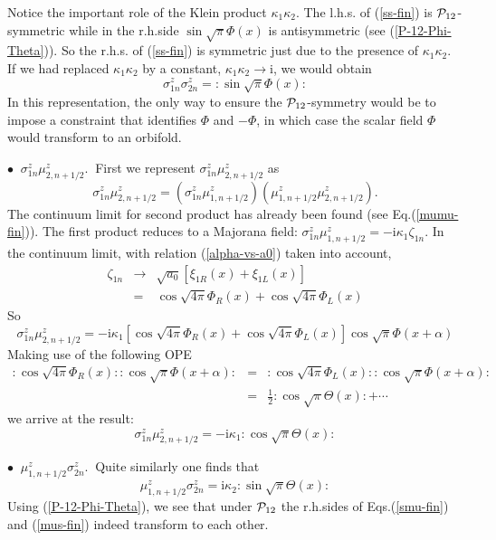 Notice the important role of the Klein product $\kappa_1 \kappa_2$.
The l.h.s. of (\ref{ss-fin}) is ${\cal{P}}_{12}$-symmetric while
in the r.h.side $\sin \sqrt{\pi} \Phi (x)$ is antisymmetric
(see (\ref{P-12-Phi-Theta})).
So the r.h.s. of (\ref{ss-fin}) is symmetric just due to
the presence of $\kappa_1 \kappa_2$. If we had replaced $\kappa_1 \kappa_2$
by a constant, $\kappa_1 \kappa_2 \rightarrow \mbox{i}$,
we would obtain
$$
\sigma^z _{1n} \sigma^z _{2n} = :\sin \sqrt{\pi} \Phi (x):
$$
In this representation, the only way
to ensure the ${\cal{P}}_{12}$-symmetry would be to
impose a constraint that identifies $\Phi$ and $- \Phi$, in which case
the scalar field $\Phi$ would transform to an orbifold.

\medskip
$\bullet~$ \underline{$\sigma^z _{1n} \mu^z _{2,n+1/2}$}.$~$
First we represent $\sigma^z _{1n} \mu^z _{2,n+1/2}$ as
$$
\sigma^z _{1n} \mu^z _{2,n+1/2} =
\left( \sigma^z _{1n} \mu^z _{1,n+1/2} \right)
\left( \mu^z _{1,n+1/2} \mu^z _{2,n+1/2}\right).
$$
The continuum limit for second product has already
been found (see Eq.(\ref{mumu-fin})).
The first product reduces to a Majorana field:
$
\sigma^z _{1n} \mu^z _{1,n+1/2} = - \mbox{i} \kappa_1 \zeta_{1n}.
$
In the continuum limit, with relation (\ref{alpha-vs-a0}) taken into account,
\begin{eqnarray}
\zeta_{1n} &\rightarrow& \sqrt{a_0} \left[ \xi_{1R} (x) + \xi_{1L} (x) \right]\nonumber\\
&=& \cos \sqrt{4\pi} \Phi_R (x) + \cos \sqrt{4\pi} \Phi_L (x)
\label{zeta_1-cont}
\end{eqnarray}
So
\begin{equation}
\sigma^z _{1n} \mu^z _{2,n+1/2} = - \mbox{i} \kappa_1
\left[ \cos \sqrt{4\pi} \Phi_R (x) + \cos \sqrt{4\pi} \Phi_L (x) \right]
\cos \sqrt{\pi} \Phi (x + \alpha)
\label{smu-int1}
\end{equation}
Making use of the following OPE
\begin{eqnarray}
:\cos \sqrt{4\pi} \Phi_R (x)::\cos \sqrt{\pi} \Phi (x + \alpha):
&=& :\cos \sqrt{4\pi} \Phi_L (x)::\cos \sqrt{\pi} \Phi (x + \alpha):\nonumber\\
&=& \frac{1}{2} :\cos \sqrt{\pi} \Theta(x): + \cdots
\label{ope-int-e}
\end{eqnarray}
we arrive at the result:
\begin{equation}
\sigma^z _{1n} \mu^z _{2,n+1/2} =
- \mbox{i} \kappa_1 :\cos \sqrt{\pi} \Theta(x):
\label{smu-fin}
\end{equation}

\medskip
$\bullet~$ \underline{$\mu^z _{1,n+1/2}\sigma^z _{2n}$}.$~$
Quite similarly one finds that
\begin{equation}
\mu^z _{1,n+1/2} \sigma^z _{2n}=
\mbox{i} \kappa_2 :\sin \sqrt{\pi} \Theta(x):
\label{mus-fin}
\end{equation}
Using (\ref{P-12-Phi-Theta}), we see
that under ${\cal{P}}_{12}$ the r.h.sides of Eqs.(\ref{smu-fin}) and
(\ref{mus-fin})
indeed transform to each other.

